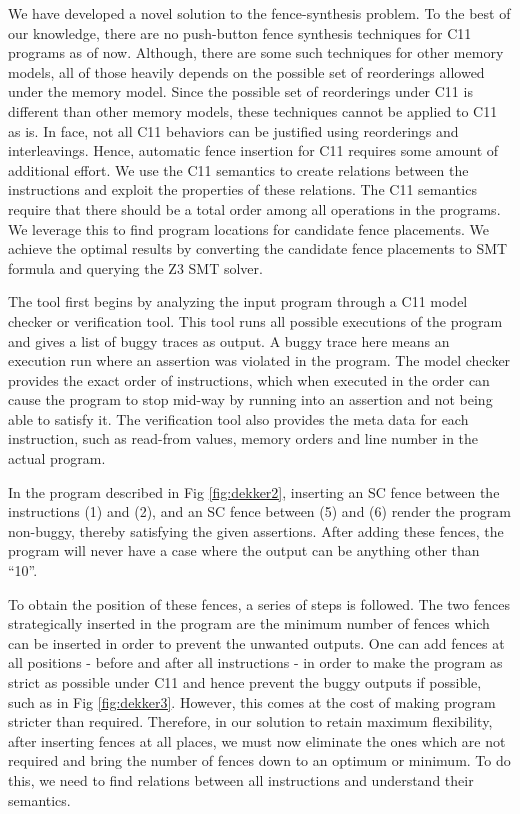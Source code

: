 We have developed a novel solution to the fence-synthesis problem. 
To the best of our knowledge, 
there are no push-button fence synthesis techniques for C11 
programs as of now. Although, there are some such techniques for 
other memory models, all of those heavily depends on the 
possible set of reorderings allowed under the memory model. 
Since the possible set of reorderings under C11 is different 
than other memory models, these techniques cannot be applied 
to C11 as is. In face, not all C11 behaviors can be justified 
using reorderings and interleavings. Hence, automatic fence insertion 
for C11 requires some amount of additional effort.
We use the C11 semantics to create relations between the 
instructions and exploit the properties of these relations. 
The C11 semantics require that there should be a total 
order among all \mosc operations in the programs. We leverage this to 
find program locations for candidate \mosc fence placements. We achieve 
the optimal results by converting the candidate fence placements to 
SMT formula and querying the Z3 SMT solver.

The tool first begins by analyzing the input program through a C11 model 
checker or verification tool. This tool runs all possible executions of 
the program and gives a list of buggy traces as output. A buggy trace 
here means an execution run where an assertion was violated in the program. 
The model checker provides the exact order of instructions, which when 
executed in the order can cause the program to stop mid-way by running 
into an assertion and not being able to satisfy it. The verification 
tool also provides the meta data for each instruction, such as read-from 
values, memory orders and line number in the actual program.

In the program described in Fig \ref{fig:dekker2}, inserting an SC fence 
between the instructions (1) and (2), and an SC fence between (5) and (6) 
render the program non-buggy, thereby satisfying the given assertions. 
After adding these fences, the program will never have a case where 
the output can be anything other than ``10''.

To obtain the position of these fences, a series of steps is followed. 
The two fences strategically inserted in the program are the minimum 
number of fences which can be inserted in order to prevent the unwanted 
outputs. One can add \mosc fences at all positions - before and after all 
instructions - in order to make the program as strict as possible under 
C11 and hence prevent the buggy outputs if possible, such as in Fig 
\ref{fig:dekker3}. However, this comes at the cost of making program 
stricter than required. Therefore, in our solution to retain maximum 
flexibility, after inserting fences at all places, we must now eliminate 
the ones which are not required and bring the number of fences down to 
an optimum or minimum. To do this, we need to find relations between 
all instructions and understand their semantics.

